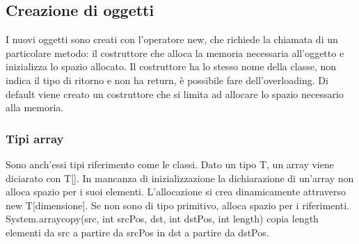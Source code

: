 \subsection{Creazione di oggetti}
I nuovi oggetti sono creati con l'operatore new, che richiede la chiamata di un particolare metodo: il costruttore che alloca la memoria necessaria all'oggetto e 
inizializza lo spazio allocato. Il costruttore ha lo stesso nome della classe, non indica il tipo di ritorno e non ha return, \`e possibile fare dell'overloading. Di 
default viene creato un costruttore che si limita ad allocare lo spazio necessario alla memoria. 
\subsubsection{Tipi array}
Sono anch'essi tipi riferimento come le classi. Dato un tipo T, un array viene diciarato con T[]. In mancanza di inizializzazione la dichiarazione di un'array non 
alloca spazio per i suoi elementi. L'allocazione si crea dinamicamente attraverso new T[dimensione]. Se non sono di tipo primitivo, alloca spazio per i riferimenti. 
System.arraycopy(src, int srcPos, dst, int dstPos, int length) copia length elementi da src a partire da srcPos in dst a partire da dstPos.